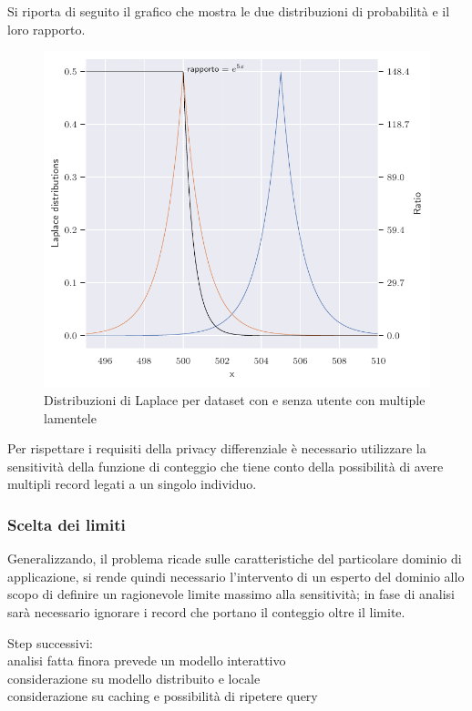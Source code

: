 Si riporta di seguito il grafico che mostra le due distribuzioni di probabilità e il loro rapporto.
\begin{figure}[H]
    \centering
    \includegraphics[scale=0.7]{plots/double_laplace_pdf.pdf}
    \caption{Distribuzioni di Laplace per dataset con e senza utente con multiple lamentele}
\end{figure}

Per rispettare i requisiti della privacy differenziale è necessario utilizzare la sensitività della funzione di conteggio che tiene conto della possibilità di avere multipli record legati a un singolo individuo.

\subsubsection{Scelta dei limiti}
Generalizzando, il problema ricade sulle caratteristiche del particolare dominio di applicazione, si rende quindi necessario l'intervento di un esperto del dominio allo scopo di definire un ragionevole limite massimo alla sensitività; in fase di analisi sarà necessario ignorare i record che portano il conteggio oltre il limite.







\newpage
Step successivi:\\
analisi fatta finora prevede un modello interattivo\\
considerazione su modello distribuito e locale\\
considerazione su caching e possibilità di ripetere query\\
